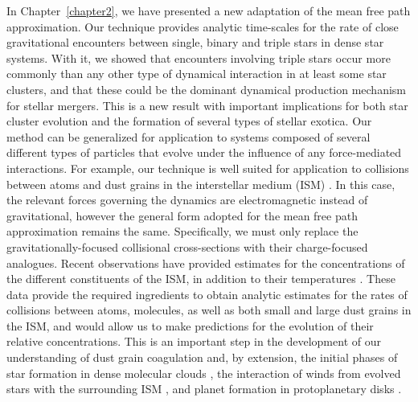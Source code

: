 In Chapter~\ref{chapter2}, we have presented a new adaptation of the
mean free path approximation.  Our technique provides analytic
time-scales for the rate of close gravitational encounters between
single, binary and triple stars in dense star systems.  With it, we
showed that encounters involving triple stars occur more commonly than
any other type of dynamical interaction in at least some star
clusters, and that these could be the dominant dynamical production
mechanism for stellar mergers.  This is a new result with important
implications for both star cluster evolution and the formation of
several types of stellar exotica.  Our method
can be generalized for application to systems composed of several
different types of particles that evolve under the influence of any
force-mediated interactions.  For example, our technique is
well suited for application to collisions between atoms and dust
grains in the interstellar medium (ISM) \citep[e.g.][]{spitzer41a,
  spitzer41b, spitzer42}.  In this case, the relevant forces governing 
the dynamics are electromagnetic instead of gravitational, however the
general form adopted for the mean free path approximation remains the same.
Specifically, we must only replace the gravitationally-focused
collisional cross-sections with their charge-focused analogues.
Recent observations have provided 
estimates for the concentrations of the different constituents of the
ISM, in addition to their temperatures \citep[e.g.][]{delburgo03,
  kiss06}.  These data provide the required ingredients %
to obtain analytic estimates for the rates of collisions between
atoms, molecules, as well as both small and large dust grains in the
ISM, and would allow us to make
predictions for the evolution of their relative concentrations.  This
is an important step in the development of our understanding of dust
grain coagulation and, by extension, the initial phases of star
formation in dense molecular clouds \citep[e.g.][]{mckee07}, the
interaction of winds from
evolved stars with the surrounding ISM \citep[e.g.][]{glassgold96},
and planet formation in protoplanetary disks \citep[e.g.][]{absil10}.

